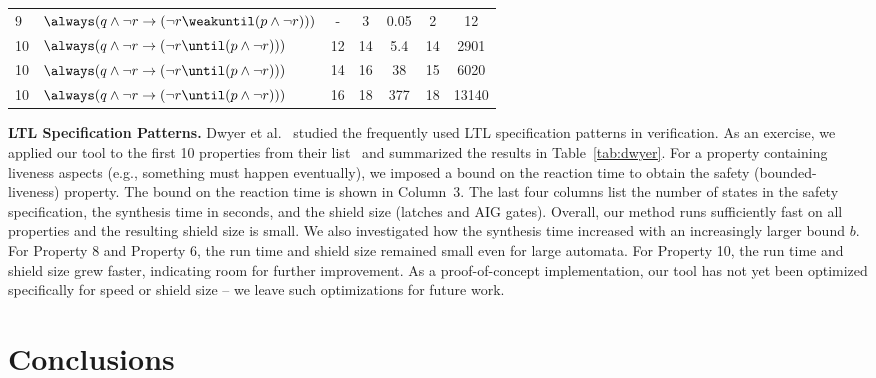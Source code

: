 \documentclass{llncs}
\begin{document}
\begin{wraptable}[18]{r}{0.631\textwidth}
{\begin{tabular}{|l|l|c||c|c|c|c|}
9   &$\always(q \wedge \neg r \rightarrow 
              (\neg r \weakuntil (p \wedge \neg r))) $
                &-  &3     &0.05      &2         &12          \\
10   &$\always(q \wedge \neg r \rightarrow 
              (\neg r \until (p \wedge \neg r))) $
                &12 &14    &5.4       &14        &2901        \\
10   &$\always(q \wedge \neg r \rightarrow 
              (\neg r \until (p \wedge \neg r))) $
                &14 &16    &38        &15        &6020        \\
10   &$\always(q \wedge \neg r \rightarrow 
              (\neg r \until (p \wedge \neg r))) $
                &16 &18    &377       &18        &13140       \\
\hline                
\end{tabular}
}
\end{wraptable}



\noindent
\textbf{LTL Specification Patterns.}
Dwyer et al.~\cite{DwyerAC99} studied the frequently used LTL 
specification patterns in verification.  As an exercise, we applied our 
tool to the first 10 properties from their list~\cite{LTLpattern-URL} 
and summarized the results in Table~\ref{tab:dwyer}.  For a property 
containing liveness aspects (e.g., something must happen eventually), we 
imposed a bound on the reaction time to obtain the safety 
(bounded-liveness) property. The bound on the  reaction time is shown in 
Column~3.  The last four columns list the number of states in the safety 
specification, the synthesis time in seconds, and the shield size 
(latches and AIG gates). Overall, our method runs sufficiently fast on 
all properties and the resulting shield size is small. We also 
investigated how the synthesis time increased with an increasingly 
larger bound $b$.  For Property 8 and Property 6, the run time and 
shield size remained small even for large automata. For Property 10, the 
run time and shield size grew faster, indicating room for further 
improvement.  As a proof-of-concept implementation, our tool has not yet 
been optimized specifically for speed or shield size -- we leave such 
optimizations for future work.

\section{Conclusions}
\label{sec:conc}
\end{document}

